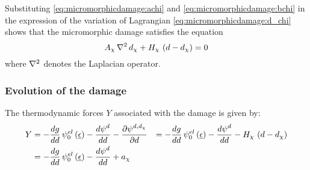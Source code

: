 Substituting \eqref{eq:micromorphicdamage:achi} and \eqref{eq:micromorphicdamage:bchi} in the expression of the variation of Lagrangian \eqref{eq:micromorphicdamage:d_chi} shows that the micromorphic damage satisfies the equation
%
%
%
\begin{equation}
  \label{eq:micromorphicdamage:d_chi2}
  A_{\chi}\,\nabla{}^2\,d_{\chi}+ H_{\chi}\,\left(d-d_{\chi}\right)= 0
\end{equation}
%
%
%
where \(\nabla{}^2\) denotes the Laplacian operator.

\subsubsection{Evolution of the damage}

The thermodynamic forces \(Y\) associated with the damage is given by:
%
%
%
\begin{equation}
  \label{eq:micromorphicdamage:Y}
  \begin{aligned}
    Y &= -\displaystyle \frac{\displaystyle dg}{\displaystyle dd}\,{\psi}^{el}_{0}\left(\underline{\epsilon}\right)-\displaystyle \frac{\displaystyle d{\psi}^{d}}{\displaystyle dd}-\displaystyle \frac{\displaystyle \partial {\psi}^{d, d_{\chi}}}{\displaystyle \partial d}
    &=-\displaystyle \frac{\displaystyle dg}{\displaystyle dd}\,{\psi}^{el}_{0}\left(\underline{\epsilon}\right)-\displaystyle \frac{\displaystyle d{\psi}^{d}}{\displaystyle dd}-H_{\chi}\,\left(d-d_{\chi}\right)
    \\
    &=-\displaystyle \frac{\displaystyle dg}{\displaystyle dd}\,{\psi}^{el}_{0}\left(\underline{\epsilon}\right)-\displaystyle \frac{\displaystyle d{\psi}^{d}}{\displaystyle dd}+a_{\chi}
    \\
  \end{aligned}
\end{equation}

